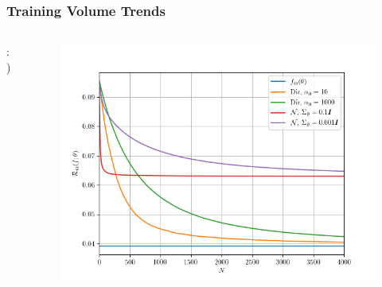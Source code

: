 \documentclass[aspectratio=169]{beamer}
\begin{document}
\begin{frame}
\frametitle{Training Volume Trends}

\begin{columns}[c]

\begin{column}{.5\linewidth}

:)

\end{column}

\begin{column}{.5\linewidth}

\begin{figure}
	\centering
	\includegraphics[width=1\linewidth]{Discrete/SE/risk_N_leg_a0.png}
	\label{fig:Discrete/SE/risk_N_leg_a0}
\end{figure}

\end{column}

\end{columns}

\end{frame}
\end{document}
